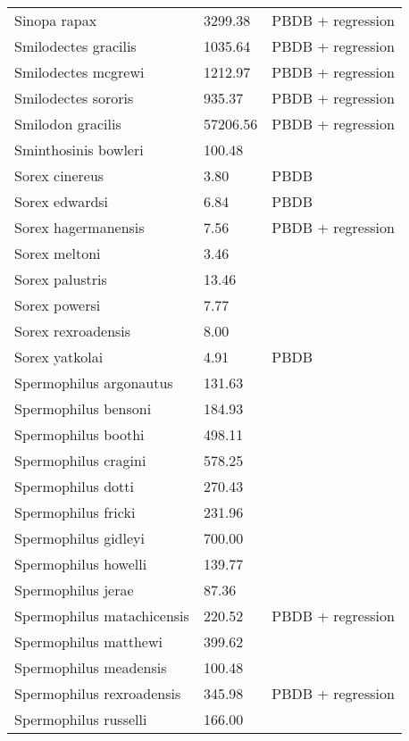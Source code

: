 \documentclass{article}
\begin{document}
\begin{center}
\begin{longtable}{p{} p{} p{} }
  Sinopa rapax & 3299.38 & PBDB + regression \\ 
  Smilodectes gracilis & 1035.64 & PBDB + regression \\ 
  Smilodectes mcgrewi & 1212.97 & PBDB + regression \\ 
  Smilodectes sororis & 935.37 & PBDB + regression \\ 
  Smilodon gracilis & 57206.56 & PBDB + regression \\ 
  Sminthosinis bowleri & 100.48 & \cite{Tomiya2013} \\ 
  Sorex cinereus & 3.80 & PBDB \\ 
  Sorex edwardsi & 6.84 & PBDB \\ 
  Sorex hagermanensis & 7.56 & PBDB + regression \\ 
  Sorex meltoni & 3.46 & \cite{Tomiya2013} \\ 
  Sorex palustris & 13.46 & \cite{Smith2004} \\ 
  Sorex powersi & 7.77 & \cite{Tomiya2013} \\ 
  Sorex rexroadensis & 8.00 & \cite{McKenna2011} \\ 
  Sorex yatkolai & 4.91 & PBDB \\ 
  Spermophilus argonautus & 131.63 & \cite{Tomiya2013} \\ 
  Spermophilus bensoni & 184.93 & \cite{Tomiya2013} \\ 
  Spermophilus boothi & 498.11 & \cite{Secord2008a} \\ 
  Spermophilus cragini & 578.25 & \cite{Tomiya2013} \\ 
  Spermophilus dotti & 270.43 & \cite{Tomiya2013} \\ 
  Spermophilus fricki & 231.96 & \cite{Simons1960} \\ 
  Spermophilus gidleyi & 700.00 & \cite{McKenna2011} \\ 
  Spermophilus howelli & 139.77 & \cite{Tomiya2013} \\ 
  Spermophilus jerae & 87.36 & \cite{Tomiya2013} \\ 
  Spermophilus matachicensis & 220.52 & PBDB + regression \\ 
  Spermophilus matthewi & 399.62 & \cite{Beatty2009} \\ 
  Spermophilus meadensis & 100.48 & \cite{Tomiya2013} \\ 
  Spermophilus rexroadensis & 345.98 & PBDB + regression \\ 
  Spermophilus russelli & 166.00 & \cite{McKenna2011} \\ 

\end{longtable}
\end{center}
\end{document}
